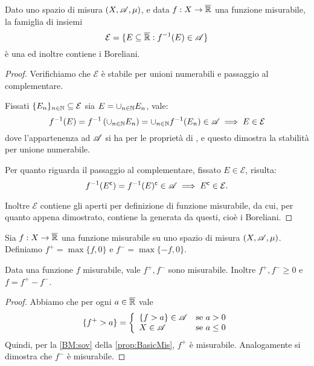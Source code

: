 \begin{proposition}\label{prop:CounterImgMis}
	Dato uno spazio di misura $(X,\mathscr A,\mu)$, e data $f:X\rightarrow \overline{\mathbb R}$ una funzione misurabile, la famiglia di insiemi
	\[
		\mathcal{E} = \{ E\subseteq \overline{\mathbb R} : f^{-1}(E)\in \mathscr A \}
	\]
	è una \sigalg{} ed inoltre contiene i Boreliani.
\end{proposition}
\begin{proof}
	Verifichiamo che $\mathcal E$ è stabile per unioni numerabili e passaggio al complementare.
	
	Fissati $\{E_n\}_{n\in \mathbb N}\subseteq \mathcal{E}$ sia $E = \cup_{n\in \mathbb N}E_n$, vale:
	\begin{equation*}
		f^{-1}(E)=f^{-1}\left(\cup_{n\in \mathbb N}E_n\right) = \cup_{n\in \mathbb N}f^{-1}(E_n)\in \mathscr A \implies E \in \mathcal{E}
	\end{equation*}
	dove l'appartenenza ad $\mathscr A$ si ha per le proprietà di \sigalg{}, e questo dimostra la stabilità per unione numerabile.
	
	Per quanto riguarda il passaggio al complementare, fissato $E\in \mathcal{E}$, risulta:
	\begin{equation*}
		f^{-1}(E^\mathsf{c})= f^{-1}(E)^\mathsf{c} \in \mathscr A \implies E^\mathsf{c} \in \mathcal{E}.
	\end{equation*}
	
	Inoltre $\mathcal E$ contiene gli aperti per definizione di funzione misurabile, da cui, per quanto appena dimostrato, contiene la \sigalg{} generata da questi, cioè i Boreliani.
\end{proof}

\begin{definition}\label{def:FpiuFmeno}
	Sia $f:X\to\overline{\mathbb R}$ una funzione misurabile su uno spazio di misura $(X,\mathscr A,\mu)$. Definiamo $f^+ = \max\{f,0\}$ e $f^- = \max\{-f,0\}$.
\end{definition}
\begin{remark}\label{nota:ProprietaFpiuFmeno}
	Data una funzione $f$ misurabile, vale $f^+,f^-$ sono misurabile. Inoltre $f^+,f^-\ge 0$ e $f=f^+-f^-$. 
\end{remark}
\begin{proof}
	Abbiamo che per ogni $a\in\overline{\mathbb R}$ vale
	\begin{equation*}
		\{f^+>a\}=\left\{\begin{array}{ll}
			\{f>a\}\in\mathscr A &\text{se }a>0\\
			X\in\mathscr A &\text{se }a\le 0
	\end{array}\right.
	\end{equation*}
	Quindi, per la \ref{BM:sov} della \cref{prop:BasicMis}, $f^+$ è misurabile. Analogamente si dimostra che $f^-$ è misurabile.
\end{proof}


